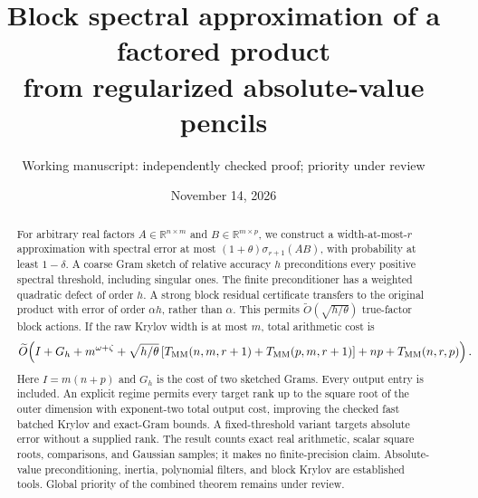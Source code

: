 \documentclass[11pt]{article}
\title{Block spectral approximation of a factored product\\
from regularized absolute-value pencils}
\author{Working manuscript: independently checked proof; priority under review}
\date{November 14, 2026}
\newcommand{\R}{\mathbb R}
\newcommand{\tO}{\widetilde O}
\newcommand{\MM}{T_{\rm MM}}
\begin{document}
\maketitle
\begin{abstract}
For arbitrary real factors \(A\in\R^{n\times m}\) and
\(B\in\R^{m\times p}\), we construct a width-at-most-\(r\) approximation
with spectral error at most \((1+\theta)\sigma_{r+1}(AB)\), with probability
at least \(1-\delta\). A coarse Gram sketch of relative accuracy \(h\)
preconditions every positive spectral threshold, including singular ones.
The finite preconditioner has a weighted quadratic defect of order \(h\).
A strong block residual certificate transfers to the original product
with error of order \(\alpha h\), rather than \(\alpha\). This permits
\(\widetilde O(\sqrt{h/\theta})\) true-factor block actions.
If the raw Krylov width is at most \(m\), total arithmetic cost is
\[
 \tO\!\left(I+G_h+m^{\omega+\zeta}
       +\sqrt{h/\theta}\,[\MM(n,m,r+1)+\MM(p,m,r+1)]
       +np+\MM(n,r,p)\right).
\]
Here \(I=m(n+p)\) and \(G_h\) is the cost of two sketched Grams.
Every output entry is included. An explicit regime permits every target
rank up to the square root of the outer dimension with exponent-two total
output cost, improving the checked fast batched Krylov and exact-Gram bounds.
A fixed-threshold variant targets absolute error without a supplied rank.
The result counts exact real arithmetic, scalar square roots, comparisons,
and Gaussian samples; it makes no finite-precision claim. Absolute-value
preconditioning, inertia, polynomial filters, and block Krylov are established
tools. Global priority of the combined theorem remains under review.
\end{abstract}
\end{document}
